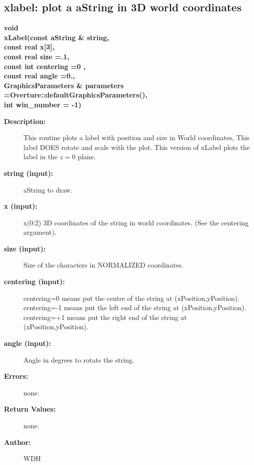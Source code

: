 \subsection{xlabel: plot a aString in 3D world coordinates}
 
\begin{flushleft} \textbf{%
void   \\ 
\settowidth{\GLGraphicsInterfaceIncludeArgIndent}{xLabel(}%
xLabel(const aString \& string,     \\ 
\hspace{\GLGraphicsInterfaceIncludeArgIndent}const real x[3], \\ 
\hspace{\GLGraphicsInterfaceIncludeArgIndent}const real size =.1,\\ 
\hspace{\GLGraphicsInterfaceIncludeArgIndent}const int centering =0 , \\ 
\hspace{\GLGraphicsInterfaceIncludeArgIndent}const real angle =0.,\\ 
GraphicsParameters \& parameters   =Overture::defaultGraphicsParameters(),\\ 
\hspace{\GLGraphicsInterfaceIncludeArgIndent}int win\_number  = -1)
}\end{flushleft}
\begin{description}
\item[{\bf Description:}] 
    This routine plots a label with position and size in World coordinates, 
    This label DOES rotate and scale with the plot. This version of xLabel plots
    the label in the $z=0$ plane.
\item[{\bf string (input):}]  aString to draw.
\item[{\bf x (input):}]  x(0:2) 3D coordinates of the string in world coordinates. (See the
    centering argument).
\item[{\bf size (input):}]  Size of the characters in NORMALIZED coordinates.
\item[{\bf centering (input):}]  {\ff centering=0} means put the centre of the string at {\ff (xPosition,yPosition)}.
    {\ff centering=-1} means put the left end of the string at {\ff (xPosition,yPosition)}.
    {\ff centering=+1} means put the right end of the string at {\ff (xPosition,yPosition)}.
\item[{\bf angle (input):}]  Angle in degrees to rotate the string.
\item[{\bf Errors:}]  none.
\item[{\bf Return Values:}]  none.
  
\item[{\bf Author:}]  WDH
\end{description}
